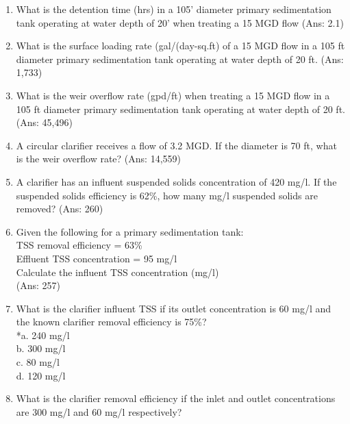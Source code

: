 \begin{enumerate}
\item  What is the detention time (hrs) in a 105' diameter primary sedimentation tank operating at water depth of 20' when treating a 15 MGD flow (Ans: 2.1)\\

\item  What is the surface loading rate (gal/(day-sq.ft) of a 15 MGD flow in a 105 ft diameter primary sedimentation tank operating at water depth of 20 ft. (Ans: 1,733)\\


\item  What is the weir overflow rate (gpd/ft) when treating a 15 MGD flow in a 105 ft diameter primary sedimentation tank operating at water depth of 20 ft. (Ans: 45,496)\\


\item  A circular clarifier receives a flow of 3.2 MGD. If the diameter is 70 ft, what is the weir overflow rate? (Ans: 14,559)\\


\item  A clarifier has an influent suspended solids concentration of 420 mg/l. If the suspended solids efficiency is 62\%, how many mg/l suspended solids are removed? (Ans: 260)\\


\item  Given the following for a primary sedimentation tank:\\
TSS removal efficiency = 63\%\\
Effluent TSS concentration = 95 mg/l\\
Calculate the influent TSS concentration (mg/l)\\
(Ans: 257)\\

\item  What is the clarifier influent TSS if its outlet concentration is 60 mg/l and the known clarifier removal efficiency is 75\%? \\


*a. 240 mg/l \\
b. 300 mg/l \\
c. 80 mg/l \\
d. 120 mg/l \\


\item  What is the clarifier removal efficiency if the inlet and outlet concentrations are 300 mg/l and 60 mg/l respectively?\\


\end{enumerate}
